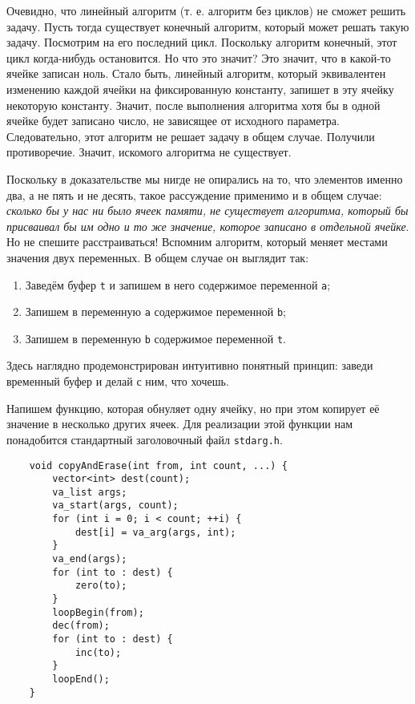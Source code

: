 \documentclass{book}
\begin{document}
Очевидно, что линейный алгоритм (т. е. алгоритм без циклов) не сможет решить задачу. Пусть тогда существует 
конечный алгоритм, который может решать такую задачу. Посмотрим на его последний цикл. Поскольку алгоритм 
конечный, этот цикл когда-нибудь остановится. Но что это значит? Это значит, что в какой-то ячейке записан ноль. 
Стало быть, линейный алгоритм, который эквивалентен изменению каждой ячейки на фиксированную константу, запишет 
в эту ячейку некоторую константу. Значит, после выполнения алгоритма хотя бы в одной ячейке будет записано 
число, не зависящее от исходного параметра. Следовательно, этот алгоритм не решает задачу в общем случае. 
Получили противоречие. Значит, искомого алгоритма не существует.

Поскольку в доказательстве мы нигде не опирались на то, что элементов именно два, а не пять и не десять, такое
рассуждение применимо и в общем случае: {\em сколько бы у нас ни было ячеек памяти, не существует алгоритма,
который бы присваивал бы им одно и то же значение, которое записано в отдельной ячейке}. Но не спешите
расстраиваться! Вспомним алгоритм, который меняет местами значения двух переменных. В общем случае он выглядит
так:

\begin{enumerate}
    \item Заведём буфер \texttt{t} и запишем в него содержимое переменной \texttt{a};
    \item Запишем в переменную \texttt{a} содержимое переменной \texttt{b};
    \item Запишем в переменную \texttt{b} содержимое переменной \texttt{t}.
\end{enumerate}

Здесь наглядно продемонстрирован интуитивно понятный принцип: заведи временный буфер и делай с ним, что хочешь.

Напишем функцию, которая обнуляет одну ячейку, но при этом копирует её значение в несколько других ячеек.
Для реализации этой функции нам понадобится стандартный заголовочный файл \texttt{stdarg.h}.

\begin{verbatim}
    void copyAndErase(int from, int count, ...) {
        vector<int> dest(count);
        va_list args;
        va_start(args, count);
        for (int i = 0; i < count; ++i) {
            dest[i] = va_arg(args, int);
        }
        va_end(args);
        for (int to : dest) {
            zero(to);
        }
        loopBegin(from);
        dec(from);
        for (int to : dest) {
            inc(to);
        }
        loopEnd();
    }
\end{verbatim}
\end{document}
